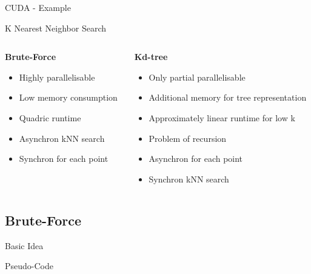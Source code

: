 \documentclass{beamer}
\begin{document}
\begin{frame}{CUDA - Example}
\end{frame}


\begin{frame}{K Nearest Neighbor Search}
  \begin{columns}[T]
   \begin{column}{0.5\textwidth}
    \textbf{Brute-Force}
    \begin{itemize}
     \item Highly parallelisable
     \item Low memory consumption
     \item Quadric runtime
     \item Asynchron kNN search
     \item Synchron for each point
    \end{itemize}
   \end{column}
  \begin{column}{0.5\textwidth}
    \textbf{Kd-tree}
    
    \begin{itemize}
     \item Only partial parallelisable
     \item Additional memory for tree representation
     \item Approximately linear runtime for low k
     \item Problem of recursion
     \item Asynchron for each point
     \item Synchron kNN search
    \end{itemize}

  \end{column}
  \end{columns}
\end{frame}

\subsection*{Brute-Force}
\begin{frame}{Basic Idea}
 
 
\end{frame}

\begin{frame}{Pseudo-Code}
 
 
\end{frame}
\end{document}
